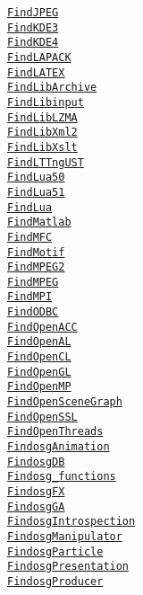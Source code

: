 \documentclass{article}
\newcommand{\cmakemodule}[1]{{\href{https://cmake.org/cmake/help/v3.20/module/#1.html}{{\lstinline{#1}}}}}
\begin{document}
\begin{minipage}[t]{0.18\linewidth}
\cmakemodule{FindJPEG}\\
\cmakemodule{FindKDE3}\\
\cmakemodule{FindKDE4}\\
\cmakemodule{FindLAPACK}\\
\cmakemodule{FindLATEX}\\
\cmakemodule{FindLibArchive}\\
\cmakemodule{FindLibinput}\\
\cmakemodule{FindLibLZMA}\\
\cmakemodule{FindLibXml2}\\
\cmakemodule{FindLibXslt}\\
\cmakemodule{FindLTTngUST}\\
\cmakemodule{FindLua50}\\
\cmakemodule{FindLua51}\\
\cmakemodule{FindLua}\\
\cmakemodule{FindMatlab}\\
\cmakemodule{FindMFC}\\
\cmakemodule{FindMotif}\\
\cmakemodule{FindMPEG2}\\
\cmakemodule{FindMPEG}\\
\cmakemodule{FindMPI}\\
\cmakemodule{FindODBC}\\
\cmakemodule{FindOpenACC}\\
\cmakemodule{FindOpenAL}\\
\cmakemodule{FindOpenCL}\\
\cmakemodule{FindOpenGL}\\
\cmakemodule{FindOpenMP}\\
\cmakemodule{FindOpenSceneGraph}\\
\cmakemodule{FindOpenSSL}\\
\cmakemodule{FindOpenThreads}\\
\cmakemodule{FindosgAnimation}\\
\cmakemodule{FindosgDB}\\
\cmakemodule{Findosg_functions}\\
\cmakemodule{FindosgFX}\\
\cmakemodule{FindosgGA}\\
\cmakemodule{FindosgIntrospection}\\
\cmakemodule{FindosgManipulator}\\
\cmakemodule{FindosgParticle}\\
\cmakemodule{FindosgPresentation}\\
\cmakemodule{FindosgProducer}\\

\end{minipage}
\end{document}
